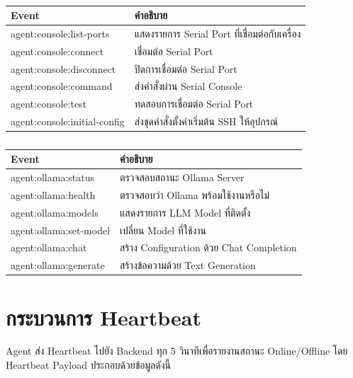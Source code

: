 \begin{table}[H]
\centering
\caption{}
\label{tabD2:ConsoleCommands}
\fontSixTeen
\begin{tabularx}{\textwidth}{|l|X|}
\hline
\textbf{Event} & \textbf{คำอธิบาย} \\
\hline
agent:console:list-ports & แสดงรายการ Serial Port ที่เชื่อมต่อกับเครื่อง \\
\hline
agent:console:connect & เชื่อมต่อ Serial Port \\
\hline
agent:console:disconnect & ปิดการเชื่อมต่อ Serial Port \\
\hline
agent:console:command & ส่งคำสั่งผ่าน Serial Console \\
\hline
agent:console:test & ทดสอบการเชื่อมต่อ Serial Port \\
\hline
agent:console:initial-config & ส่งชุดคำสั่งตั้งค่าเริ่มต้น SSH ให้อุปกรณ์ \\
\hline
\end{tabularx}
\end{table}

\begin{table}[H]
\centering
\caption{}
\label{tabD2:OllamaCommands}
\fontSixTeen
\begin{tabularx}{\textwidth}{|l|X|}
\hline
\textbf{Event} & \textbf{คำอธิบาย} \\
\hline
agent:ollama:status & ตรวจสอบสถานะ Ollama Server \\
\hline
agent:ollama:health & ตรวจสอบว่า Ollama พร้อมใช้งานหรือไม่ \\
\hline
agent:ollama:models & แสดงรายการ LLM Model ที่ติดตั้ง \\
\hline
agent:ollama:set-model & เปลี่ยน Model ที่ใช้งาน \\
\hline
agent:ollama:chat & สร้าง Configuration ด้วย Chat Completion \\
\hline
agent:ollama:generate & สร้างข้อความด้วย Text Generation \\
\hline
\end{tabularx}
\end{table}

\section{กระบวนการ Heartbeat}
\hspace*{1.3em}
Agent ส่ง Heartbeat ไปยัง Backend ทุก 5 วินาทีเพื่อรายงานสถานะ Online/Offline โดย Heartbeat Payload ประกอบด้วยข้อมูลดังนี้

